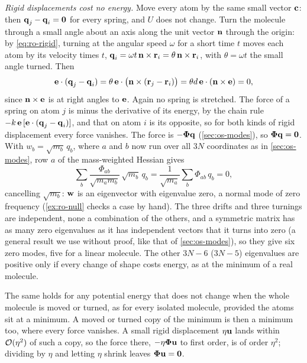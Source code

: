 \emph{Rigid displacements cost no energy.} Move every atom by the same
small vector $\bm{\mathrm{c}}$: then $\bm{\mathrm{q}}_j - \bm{\mathrm{q}}_i = \bm{\mathrm{0}}$ for every
spring, and $U$ does not change. Turn the molecule through a small angle
about an axis along the unit vector $\bm{\mathrm{n}}$ through the origin: by
\cref{eq:ro-rigid}, turning at the angular speed $\omega$ for a short time
$t$ moves each atom by its velocity times $t$, $\bm{\mathrm{q}}_i = \omega t\,\bm{\mathrm{n}}
\times\bm{\mathrm{r}}_i = \theta\,\bm{\mathrm{n}}\times\bm{\mathrm{r}}_i$, with $\theta =
\omega t$ the small angle turned. Then
\begin{equation*}
   \bm{\mathrm{e}}\cdot(\bm{\mathrm{q}}_j - \bm{\mathrm{q}}_i)
   = \theta\,\bm{\mathrm{e}}\cdot\bigl(\bm{\mathrm{n}}\times(\bm{\mathrm{r}}_j - \bm{\mathrm{r}}_i)\bigr)
   = \theta d\,\bm{\mathrm{e}}\cdot(\bm{\mathrm{n}}\times\bm{\mathrm{e}}) = 0 ,
\end{equation*}
since $\bm{\mathrm{n}}\times\bm{\mathrm{e}}$ is at right angles to $\bm{\mathrm{e}}$. Again no spring
is stretched. The force of a spring on atom $j$ is minus the derivative of
its energy, by the chain rule $-k\,\bm{\mathrm{e}}\,[\bm{\mathrm{e}}\cdot(\bm{\mathrm{q}}_j -
\bm{\mathrm{q}}_i)]$, and that on atom $i$ is its opposite, so for both kinds of
rigid displacement every force vanishes. The force is
$-\boldsymbol{\Phi}\bm{\mathrm{q}}$ (\cref{sec:os-modes}), so $\boldsymbol{\Phi}
\bm{\mathrm{q}} = \bm{\mathrm{0}}$. With $w_b = \sqrt{m_b}\,q_b$, where $a$ and $b$ now run
over all $3N$ coordinates as in \cref{sec:os-modes}, row $a$ of the
mass-weighted Hessian gives
\begin{equation*}
   \sum_b\frac{\Phi_{ab}}{\sqrt{m_am_b}}\,\sqrt{m_b}\,q_b
   = \frac{1}{\sqrt{m_a}}\sum_b\Phi_{ab}\,q_b = 0 ,
\end{equation*}
cancelling $\sqrt{m_b}$: $\bm{\mathrm{w}}$ is an eigenvector with eigenvalue zero, a
normal mode of zero frequency (\cref{ex:ro-null} checks a case by hand).
The three drifts and three turnings are independent, none a combination
of the others, and a symmetric matrix has as many zero eigenvalues as it
has independent vectors that it turns into zero (a general result we use
without proof, like that of \cref{sec:os-modes}), so they give six zero
modes, five for a linear molecule. The other $3N - 6$ ($3N - 5$)
eigenvalues are positive only if every change of shape costs energy, as at
the minimum of a real molecule.

The same holds for any potential energy that does not change when the
whole molecule is moved or turned, as for every isolated molecule,
provided the atoms sit at a minimum. A moved or turned copy of the minimum
is then a minimum too, where every force vanishes. A small rigid
displacement $\eta\bm{\mathrm{u}}$ lands within $\mathcal{O}(\eta^2)$ of
such a copy, so the force there, $-\eta\boldsymbol{\Phi}\bm{\mathrm{u}}$ to
first order, is of order $\eta^2$; dividing by $\eta$ and
letting $\eta$ shrink leaves $\boldsymbol{\Phi}\bm{\mathrm{u}} = \bm{\mathrm{0}}$.

